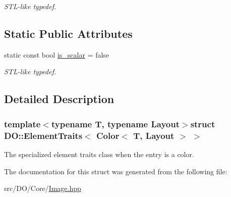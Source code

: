\begin{DoxyCompactItemize}
\begin{DoxyCompactList}\small\item\em S\-T\-L-\/like typedef. \end{DoxyCompactList}\end{DoxyCompactItemize}
\subsection*{Static Public Attributes}
\begin{DoxyCompactItemize}
\item 
\hypertarget{struct_d_o_1_1_element_traits_3_01_color_3_01_t_00_01_layout_01_4_01_4_a083611162fed7f6427026ec1d5cd6678}{static const bool \hyperlink{struct_d_o_1_1_element_traits_3_01_color_3_01_t_00_01_layout_01_4_01_4_a083611162fed7f6427026ec1d5cd6678}{is\-\_\-scalar} = false}\label{struct_d_o_1_1_element_traits_3_01_color_3_01_t_00_01_layout_01_4_01_4_a083611162fed7f6427026ec1d5cd6678}

\begin{DoxyCompactList}\small\item\em S\-T\-L-\/like typedef. \end{DoxyCompactList}\end{DoxyCompactItemize}


\subsection{Detailed Description}
\subsubsection*{template$<$typename T, typename Layout$>$struct D\-O\-::\-Element\-Traits$<$ Color$<$ T, Layout $>$ $>$}

The specialized element traits class when the entry is a color. 

The documentation for this struct was generated from the following file\-:\begin{DoxyCompactItemize}
\item 
src/\-D\-O/\-Core/\hyperlink{_image_8hpp}{Image.\-hpp}\end{DoxyCompactItemize}
